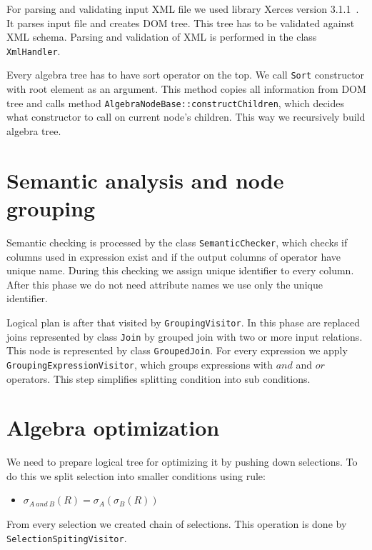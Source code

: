 For parsing and validating input XML file we used library Xerces version 3.1.1~\cite{xerces}. It parses input file and creates DOM tree. This tree has to be validated against XML schema. Parsing and validation of XML is performed in the class \texttt{XmlHandler}.

Every algebra tree has to have sort operator on the top. We call \texttt{Sort} constructor with root element as an argument. This method copies all information from DOM tree and calls method \texttt{AlgebraNodeBase::constructChildren}, which decides what constructor to call on current node's children. This way we recursively build algebra tree.



\section{Semantic analysis and node grouping}

Semantic checking is processed by the class \texttt{SemanticChecker}, which checks if columns used in expression exist and if the output columns of operator have unique name. During this checking we assign unique identifier to every column. After this phase we do not need attribute names we use only the unique identifier.

Logical plan is after that visited by \texttt{GroupingVisitor}. In this phase are replaced joins represented by class \texttt{Join} by grouped join with two or more input relations. This node is represented by class \texttt{GroupedJoin}. For every expression we apply \texttt{GroupingExpressionVisitor}, which groups expressions with $and$ and $or$ operators. This step simplifies splitting condition into sub conditions.

\section{Algebra optimization}

We need to prepare logical tree for optimizing it by pushing down selections. To do this we split selection into smaller conditions using rule:
\begin{itemize}
\item $\sigma_{A~and~B}(R)=\sigma_{A}(\sigma_{B}(R))$
\end{itemize}
From every selection we created chain of selections. This operation is done by \texttt{SelectionSpitingVisitor}.

